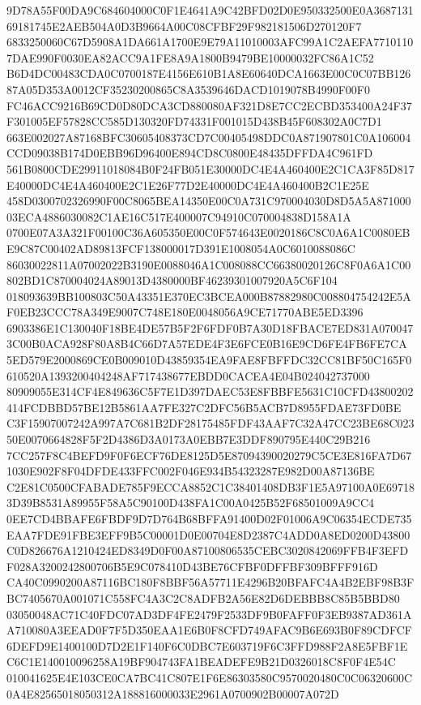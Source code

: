 \documentclass[UTF8,fontset=fandol,zihao=-4,a4paper]{ctexart}
\begin{document}
{{9D78A55F00DA9C684604000C0F1E4641A9C42BFD02D0E950332500E0A368713169181745E2AEB504A0D3B9664A00C08CFBF29F982181506D270120F7
6833250060C67D5908A1DA661A1700E9E79A11010003AFC99A1C2AEFA77101107DAE990F0030EA82ACC9A1FE8A9A1800B9479BE10000032FC86A1C52
B6D4DC00483CDA0C0700187E4156E610B1A8E60640DCA1663E00C0C07BB12687A05D353A0012CF35230200865C8A3539646DACD1019078B4990F00F0
FC46ACC9216B69CD0D80DCA3CD880080AF321D8E7CC2ECBD353400A24F37F301005EF57828CC585D130320FD74331F001015D438B45F608302A0C7D1
663E002027A87168BFC30605408373CD7C00405498DDC0A871907801C0A106004CCD09038B174D0EBB96D96400E894CD8C0800E48435DFFDA4C961FD
561B0800CDE29911018084B0F24FB051E30000DC4E4A460400E2C1CA3F85D817E40000DC4E4A460400E2C1E26F77D2E40000DC4E4A460400B2C1E25E
458D0300702326990F00C8065BEA14350E00C0A731C970004030D8D5A5A87100003ECA4886030082C1AE16C517E400007C94910C070004838D158A1A
0700E07A3A321F00100C36A605350E00C0F574643E0020186C8C0A6A1C0080EBE9C87C00402AD89813FCF138000017D391E1008054A0C6010088086C
86030022811A07002022B3190E0088046A1C008088CC66380020126C8F0A6A1C00802BD1C870004024A89013D4380000BF46239301007920A5C6F104
018093639BB100803C50A43351E370EC3BCEA000B87882980C008804754242E5AF0EB23CCC78A349E9007C748E180E0048056A9CE71770ABE5ED3396
6903386E1C130040F18BE4DE57B5F2F6FDF0B7A30D18FBACE7ED831A0700473C00B0ACA928F80A8B4C66D7A57EDE4F3E6FCE0B16E9CD6FE4FB6FE7CA
5ED579E2000869CE0B009010D43859354EA9FAE8FBFFDC32CC81BF50C165F0610520A1393200404248AF717438677EBDD0CACEA4E04B024042737000
80909055E314CF4E849636C5F7E1D397DAEC53E8FBBFE5631C10CFD43800202414FCDBBD57BE12B5861AA7FE327C2DFC56B5ACB7D8955FDAE73FD0BE
C3F15907007242A997A7C681B2DF28175485FDF43AAF7C32A47CC23BE68C02350E0070664828F5F2D4386D3A0173A0EBB7E3DDF890795E440C29B216
7CC257F8C4BEFD9F0F6ECF76DE8125D5E87094390020279C5CE3E816FA7D671030E902F8F04DFDE433FFC002F046E934B54323287E982D00A87136BE
C2E81C0500CFABADE785F9ECCA8852C1C38401408DB3F1E5A97100A0E697183D39B8531A89955F58A5C90100D438FA1C00A0425B52F68501009A9CC4
0EE7CD4BBAFE6FBDF9D7D764B68BFFA91400D02F01006A9C06354ECDE735EAA7FDE91FBE3EFF9B5C00001D0E00704E8D2387C4ADD0A8ED0200D43800
C0D826676A1210424ED8349D0F00A87100806535CEBC3020842069FFB4F3EFDF028A3200242800706B5E9C078410D43BE76CFBF0DFFBF309BFFF916D
CA40C0990200A87116BC180F8BBF56A57711E4296B20BFAFC4A4B2EBF98B3FBC7405670A001071C558FC4A3C2C8ADFB2A56E82D6DEBBB8C85B5BBD80
03050048AC71C40FDC07AD3DF4FE2479F2533DF9B0FAFF0F3EB9387AD361AA710080A3EEAD0F7F5D350EAA1E6B0F8CFD749AFAC9B6E693B0F89CDFCF
6DEFD9E1400100D7D2E1F140F6C0DBC7E603719F6C3FFD988F2A8E5FBF1EC6C1E140010096258A19BF904743FA1BEADEFE9B21D0326018C8F0F4E54C
010041625E4E103CE0CA7BC41C807E1F6E86303580C9570020480C0C06320600C0A4E82565018050312A188816000033E2961A0700902B00007A072D
}}
\end{document}
